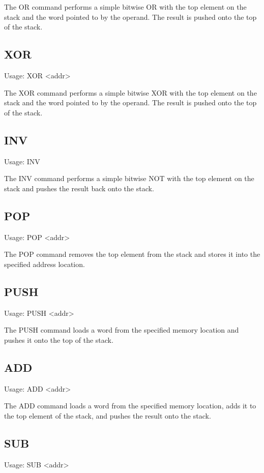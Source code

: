 \documentclass{book}
\begin{document}
  The OR command performs a simple bitwise OR with the top element on the stack and
  the word pointed to by the operand. The result is pushed onto the top of the stack.

\subsection{XOR}
  Usage: XOR \textless addr\textgreater 

  The XOR command performs a simple bitwise XOR with the top element on the stack and
  the word pointed to by the operand. The result is pushed onto the top of the stack.

\subsection{INV}
  Usage: INV

  The INV command performs a simple bitwise NOT with the top element on the stack and
  pushes the result back onto the stack.

\subsection{POP}
  Usage: POP \textless addr\textgreater 

  The POP command removes the top element from the stack and stores it into the specified
  address location.

\subsection{PUSH}
  Usage: PUSH \textless addr\textgreater 

  The PUSH command loads a word from the specified memory location and pushes it onto
  the top of the stack.

\subsection{ADD}
  Usage: ADD \textless addr\textgreater 

  The ADD command loads a word from the specified memory location, adds it to the top element
  of the stack, and pushes the result onto the stack.

\subsection{SUB}
  Usage: SUB \textless addr\textgreater 
\end{document}
